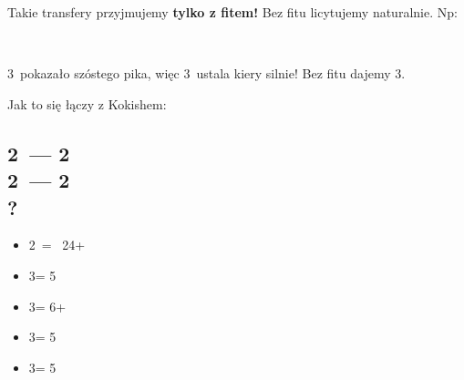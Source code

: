 \documentclass[12pt, a4paper]{article}
\begin{document}
Takie transfery przyjmujemy \textbf{tylko z fitem!} Bez fitu licytujemy naturalnie. Np:

\webidding{
    2\clubs\ & 2\diams \\
    2\spades\ & 2\nt \\
    \conventional{3\hearts} & 3\spades
} \\[1em] \raggedright

3\diams\ pokazało szóstego pika, więc 3\spades\ ustala kiery silnie! Bez fitu dajemy 3\nt.

\raggedright
Jak to się łączy z Kokishem: \\[1em]
\subsection*{2\clubs\ --- 2\diams\ \\ 2\hearts\ --- 2\spades\ \\ ?}
\begin{itemize}
    \item 2\nt\ = \bal\ 24+
    \item 3\clubs = 5\diams
    \item 3\diams = 6+\hearts
    \item 3\hearts = 5\spades
    \item 3\spades = 5\clubs
\end{itemize}
\end{document}
